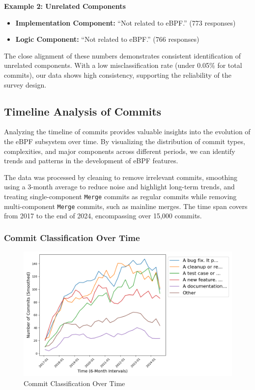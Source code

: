 \textbf{Example 2: Unrelated Components}
\begin{itemize}
    \item \textbf{Implementation Component:} ``Not related to eBPF.'' (773 responses)
    \item \textbf{Logic Component:} ``Not related to eBPF.'' (766 responses)
\end{itemize}

The close alignment of these numbers demonstrates consistent identification of unrelated components. With a low misclassification rate (under 0.05\% for total commits), our data shows high consistency, supporting the reliability of the survey design.

\subsection{Timeline Analysis of Commits}

Analyzing the timeline of commits provides valuable insights into the evolution of the eBPF subsystem over time. By visualizing the distribution of commit types, complexities, and major components across different periods, we can identify trends and patterns in the development of eBPF features.

The data was processed by cleaning to remove irrelevant commits, smoothing using a 3-month average to reduce noise and highlight long-term trends, and treating single-component \texttt{Merge} commits as regular commits while removing multi-component \texttt{Merge} commits, such as mainline merges. The time span covers from 2017 to the end of 2024, encompassing over 15,000 commits.

\subsubsection{Commit Classification Over Time}

\begin{figure}[ht]
    \centering
    \includegraphics[width=\linewidth]{feature-analysis/timeline_commit_classification_smoothed.png}
    \caption{Commit Classification Over Time}
    \label{fig:timeline_commit_classification_smoothed}
\end{figure}

